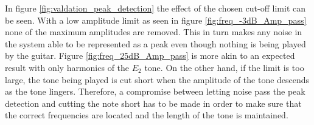 In figure \ref{fig:valdation_peak_detection} the effect of the chosen cut-off limit can be seen.
With a low amplitude limit as seen in figure \ref{fig:freq_-3dB_Amp_pass} none of the maximum amplitudes are removed.
This in turn makes any noise in the system able to be represented as a peak even though nothing is being played by the guitar.
Figure \ref{fig:freq_25dB_Amp_pass} is more akin to an expected result with only harmonics of the $E_2$ tone.
On the other hand, if the limit is too large, the tone being played is cut short when the amplitude of the tone descends as the tone lingers.
Therefore, a compromise between letting noise pass the peak detection and cutting the note short has to be made in order to make sure that the correct frequencies are located and the length of the tone is maintained.